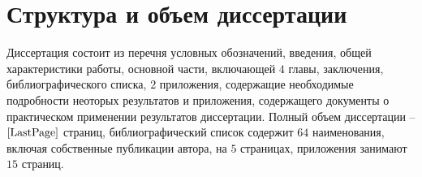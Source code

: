 \documentclass[_00_dissertation.tex]{subfiles}
\begin{document}
\section*{Структура и объем диссертации}

Диссертация состоит из перечня условных обозначений, введения, общей характеристики работы, основной части, включающей $4$ главы, заключения, библиографического списка, $2$ приложения, содержащие необходимые подробности неоторых результатов и приложения, содержащего документы о практическом применении результатов диссертации.
Полный объем диссертации -- $\pageref{LastPage}$ страниц, библиографический список содержит $64$ наименования, включая собственные публикации автора, на $5$ страницах, приложения занимают $15$ страниц.

\onlyinsubfile{
    
}
\end{document}
